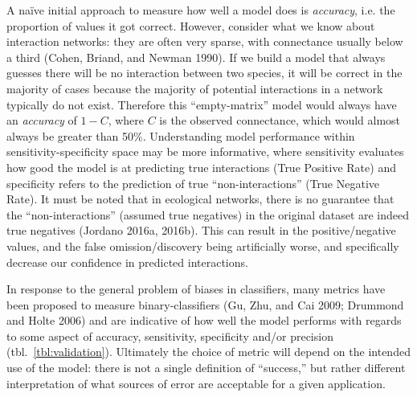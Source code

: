 \documentclass[11pt]{article}
\begin{document}
A naïve initial approach to measure how well a model does is
\emph{accuracy}, i.e. the proportion of values it got correct. However,
consider what we know about interaction networks: they are often very
sparse, with connectance usually below a third (Cohen, Briand, and
Newman 1990). If we build a model that always guesses there will be no
interaction between two species, it will be correct in the majority of
cases because the majority of potential interactions in a network
typically do not exist. Therefore this ``empty-matrix'' model would
always have an \emph{accuracy} of \(1-C\), where \(C\) is the observed
connectance, which would almost always be greater than 50\%.
Understanding model performance within sensitivity-specificity space may
be more informative, where sensitivity evaluates how good the model is
at predicting true interactions (True Positive Rate) and specificity
refers to the prediction of true ``non-interactions'' (True Negative
Rate). It must be noted that in ecological networks, there is no
guarantee that the ``non-interactions'' (assumed true negatives) in the
original dataset are indeed true negatives (Jordano 2016a, 2016b). This
can result in the positive/negative values, and the false
omission/discovery being artificially worse, and specifically decrease
our confidence in predicted interactions.

In response to the general problem of biases in classifiers, many
metrics have been proposed to measure binary-classifiers (Gu, Zhu, and
Cai 2009; Drummond and Holte 2006) and are indicative of how well the
model performs with regards to some aspect of accuracy, sensitivity,
specificity and/or precision (tbl.~\ref{tbl:validation}). Ultimately the
choice of metric will depend on the intended use of the model: there is
not a single definition of ``success,'' but rather different
interpretation of what sources of error are acceptable for a given
application.
\end{document}
